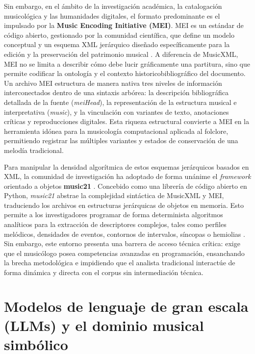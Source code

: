 Sin embargo, en el ámbito de la investigación académica, la catalogación musicológica y las humanidades digitales, el formato predominante es el impulsado por la \textbf{Music Encoding Initiative (MEI)}. MEI es un estándar de código abierto, gestionado por la comunidad científica, que define un modelo conceptual y un esquema XML jerárquico diseñado específicamente para la edición y la preservación del patrimonio musical \citep{roland2002music}. A diferencia de MusicXML, MEI no se limita a describir cómo debe lucir gráficamente una partitura, sino que permite codificar la ontología y el contexto historicobibliográfico del documento. Un archivo MEI estructura de manera nativa tres niveles de información interconectados dentro de una sintaxis arbórea: la descripción bibliográfica detallada de la fuente (\textit{meiHead}), la representación de la estructura musical e interpretativa (\textit{music}), y la vinculación con variantes de texto, anotaciones críticas y reproducciones digitales. Esta riqueza estructural convierte a MEI en la herramienta idónea para la musicología computacional aplicada al folclore, permitiendo registrar las múltiples variantes y estados de conservación de una melodía tradicional.

Para manipular la densidad algorítmica de estos esquemas jerárquicos basados en XML, la comunidad de investigación ha adoptado de forma unánime el \textit{framework} orientado a objetos \textbf{music21} \citep{cuthbert2010music21}. Concebido como una librería de código abierto en Python, \textit{music21} abstrae la complejidad sintáctica de MusicXML y MEI, traduciendo los archivos en estructuras jerárquicas de objetos en memoria. Esto permite a los investigadores programar de forma determinista algoritmos analíticos para la extracción de descriptores complejos, tales como perfiles melódicos, densidades de eventos, contornos de intervalos, síncopas o hemiolias \citep{cuthbert2010music21}. Sin embargo, este entorno presenta una barrera de acceso técnica crítica: exige que el musicólogo posea competencias avanzadas en programación, ensanchando la brecha metodológica e impidiendo que el analista tradicional interactúe de forma dinámica y directa con el corpus sin intermediación técnica.

\section{Modelos de lenguaje de gran escala (LLMs) y el dominio musical simbólico}
\label{sec:llms_musicales}

